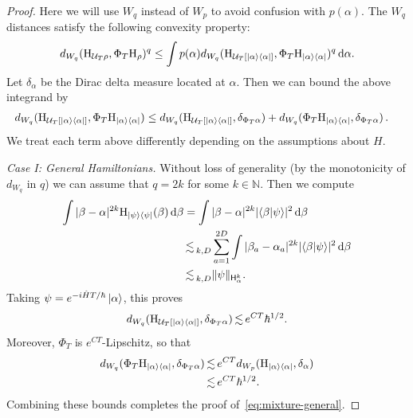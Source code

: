 \documentclass[11pt]{amsart}
\def\Husimi{{\mathrm{H}}}
\def\Sobolev{{\mathsf{H}}}
\def\bbN{{\mathbb{N}}}
\newcommand{\diff}{\mathop{}\!\mathrm{d}}
\def\lsim{{\,\lesssim\,}}
\newcommand{\mcal}[1]{{\mathcal{#1}}}
\def\bra#1{\mathinner{\langle{#1}|}}
\def\ket#1{\mathinner{|{#1}\rangle}}
\def\Braket#1{\!\mathinner{\langle{#1}\rangle}\!}
\numberwithin{equation}{section}
\begin{document}
\begin{proof}
Here we will use $W_q$ instead of $W_p$ to avoid confusion with $p(\alpha)$.  The $W_q$ distances satisfy the following convexity property:
\begin{align*}
d_{W_q}(\Husimi_{\mcal{U}_T\rho}, \Phi_T \Husimi_{\rho})^q \leq
\int p(\alpha) d_{W_q}(\Husimi_{\mcal{U}_T[\ket{\alpha}\bra{\alpha}]}, \Phi_T\Husimi_{\ket{\alpha}\bra{\alpha}})^q \diff \alpha.
\end{align*}
Let $\delta_\alpha$ be the Dirac delta measure located at $\alpha$.  Then we can bound the above
integrand by
\begin{align*}
d_{W_q}(\Husimi_{\mcal{U}_T[\ket{\alpha}\bra{\alpha}]}, \Phi_T\Husimi_{\ket{\alpha}\bra{\alpha}})
&\leq
d_{W_q}(\Husimi_{\mcal{U}_T[\ket{\alpha}\bra{\alpha}]}, \delta_{\Phi_T\alpha}) +
d_{W_q}(\Phi_T \Husimi_{\ket{\alpha}\bra{\alpha}}, \delta_{\Phi_T\alpha})\,.
\end{align*}
We treat each term above differently depending on the assumptions about $H$.

\textit{Case I: General Hamiltonians.}
Without loss of generality (by the monotonicity of $d_{W_q}$ in $q$) we can assume that $q=2k$ for some $k\in\bbN$.
Then we compute
\begin{align*}
\int |\beta-\alpha|^{2k}\Husimi_{\ket{\psi}\bra{\psi}}(\beta)\diff \beta
&= \int |\beta-\alpha|^{2k} |\Braket{\beta|\psi}|^2 \diff \beta \\
&\lsim_{k,D} \sum_{a=1}^{2D}
\int |\beta_a-\alpha_a|^{2k} |\Braket{\beta|\psi}|^2 \diff \beta \\
&\lsim_{k,D} \|\psi\|_{\Sobolev^k_\alpha}.
\end{align*}
Taking $\psi = e^{-i\hat{H}T/\hbar}\ket{\alpha}$, this proves
\begin{equation}
d_{W_q}(\Husimi_{\mcal{U}_T[\ket{\alpha}\bra{\alpha}]}, \delta_{\Phi_T \alpha})
\lsim e^{CT} \hbar^{1/2}.
\end{equation}
Moreover, $\Phi_T$ is $e^{CT}$-Lipschitz, so that
\begin{align*}
d_{W_q}(\Phi_T \Husimi_{\ket{\alpha}\bra{\alpha}}, \delta_{\Phi_T\alpha})
&\lsim e^{CT} d_{W_p}(\Husimi_{\ket{\alpha}\bra{\alpha}}, \delta_{\alpha})\\
&\lsim e^{CT}\hbar^{1/2}.
\end{align*}
Combining these bounds completes the proof of~\eqref{eq:mixture-general}.


\end{proof}
\end{document}
